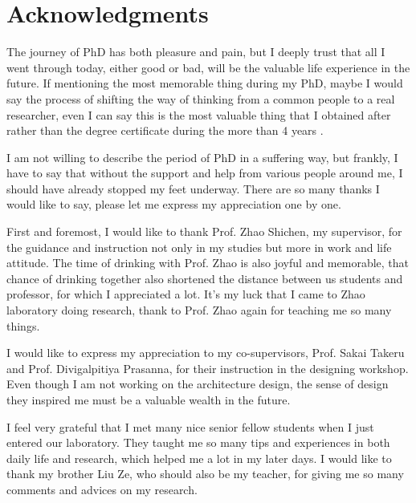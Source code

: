 \documentclass[12pt, twoside, a4paper]{book} %
\renewcommand{\baselinestretch}{1.5} %
\begin{document}
\renewcommand{\baselinestretch}{1.5} %
\fontsize{13pt}{13pt} %
\selectfont

\chapter{Acknowledgments}
The journey of PhD has both pleasure and pain, but I deeply trust that all I went through today, either good or bad, will be the valuable life experience in the future. If mentioning the most memorable thing during my PhD, maybe I would say the process of shifting the way of thinking from a common people to a real researcher, even I can say this is the most valuable thing that I obtained after rather than the degree certificate during the more than 4 years .

I am not willing to describe the period of PhD in a suffering way, but frankly, I have to say that without the support and help from various people around me, I should have already stopped my feet underway. There are so many thanks I would like to say, please let me express my appreciation one by one.

First and foremost, I would like to thank Prof. Zhao Shichen, my supervisor, for the guidance and instruction not only in my studies but more in work and life attitude. The time of drinking with Prof. Zhao is also joyful and memorable, that chance of drinking together also shortened the distance between us students and professor, for which I appreciated a lot. It's my luck that I came to Zhao laboratory doing research, thank to Prof. Zhao again for teaching me so many things.

I would like to express my appreciation to my co-supervisors, Prof. Sakai Takeru and Prof. Divigalpitiya Prasanna, for their instruction in the designing workshop. Even though I am not working on the architecture design, the sense of design they inspired me must be a valuable wealth in the future.

I feel very grateful that I met many nice senior fellow students when I just entered our laboratory. They taught me so many tips and experiences in both daily life and research, which helped me a lot in my later days. I would like to thank my brother Liu Ze, who should also be my teacher, for giving me so many comments and advices on my research. 
\end{document}
